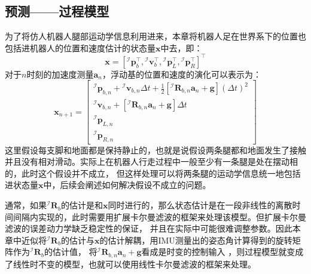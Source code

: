 \subsection{预测——过程模型}
为了将仿人机器人腿部运动学信息利用进来，本章将机器人足在世界系下的位置也包括进机器人的位置和速度估计的状态量$\boldsymbol{x}$中去，即：
\begin{equation}
    \label{equ:est_posvel}
    \boldsymbol{x}=\left[{ }^\mathcal{I} \boldsymbol{p}_b^{\top},{ }^\mathcal{I} \boldsymbol{v}_b^{\top},{ }^\mathcal{I} \boldsymbol{p}_L^{\top},{ }^\mathcal{I} \boldsymbol{p}_R^{\top}\right]^{\top}
\end{equation}
对于$n$时刻的加速度测量$\boldsymbol{a}_n$，浮动基的位置和速度的演化可以表示为：
\begin{equation}
    \label{equ:est_posvel}
    \boldsymbol{x}_{n+1}=\left[\begin{array}{c}
        { }^{\mathcal{I}} \boldsymbol{p}_{b, n}+{ }^{\mathcal{I}} \boldsymbol{v}_{b, n} \Delta t+\frac{1}{2}\left[{ }^{\mathcal{I}} \boldsymbol{R}_{b, n} \boldsymbol{a}_n+\boldsymbol{g}\right](\Delta t)^2 \\
        { }^{\mathcal{I}} \boldsymbol{v}_{b, n}+\left[{ }^{\mathcal{I}} \boldsymbol{R}_{b, n} \boldsymbol{a}_n+\boldsymbol{g}\right] \Delta t \\
        { }^{\mathcal{I}} \boldsymbol{p}_{L, n} \\
        { }^{\mathcal{I}} \boldsymbol{p}_{R, n}
        \end{array}\right]
\end{equation}
这里假设每支脚和地面都是保持静止的，也就是说假设两条腿都和地面发生了接触并且没有相对滑动。实际上在机器人行走过程中一般至少有一条腿是处在摆动相的，此时这个假设并不成立，
但这样处理可以将两条腿的运动学信息统一地包括进状态量$\boldsymbol{x}$中，后续会阐述如何解决假设不成立的问题。

通常，如果${ }^{\mathcal{I}} \boldsymbol{R}_{b}$的估计是和$\boldsymbol{x}$同时进行的，那么状态估计是在一段非线性的离散时间间隔内实现的，此时需要用扩展卡尔曼滤波的框架来处理该模型。但扩展卡尔曼滤波的误差动力学缺乏稳定性的保证，
并且在实际中可能很难调整参数。因此本章中近似将${ }^{\mathcal{I}} \boldsymbol{R}_{b}$的估计与$\boldsymbol{x}$的估计解耦，用IMU测量出的姿态角计算得到的旋转矩阵作为${ }^{\mathcal{I}} \boldsymbol{R}_{b}$的估计值，
将${ }^{\mathcal{I}} \boldsymbol{R}_{b, n} \boldsymbol{a}_n+\boldsymbol{g}$看成是时变的控制输入 ，则过程模型就变成了线性时不变的模型，也就可以使用线性卡尔曼滤波的框架来处理。
